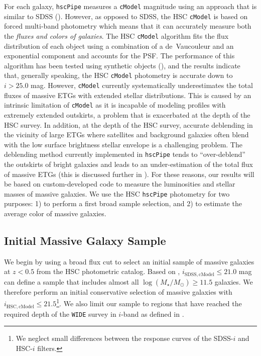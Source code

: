 \documentclass[a4paper,fleqn,usenatbib]{mnras}
\def\cmodel{\texttt{cModel}}
\def\logms{{$\log (M_{\star}/M_{\odot})$}}
\begin{document}
    For each galaxy, \texttt{hscPipe} measures a \cmodel{} magnitude using an approach 
    that is similar to SDSS (\citealt{HSC-PIPE}). 
    However, as opposed to SDSS, the HSC \cmodel{} is based on forced multi-band 
    photometry which means that it can accurately measure both the 
    \textit{fluxes and colors of galaxies}. 
    The HSC \cmodel{} algorithm fits the flux distribution of each object using a 
    combination of a de~Vaucouleur and an exponential component and accounts for the PSF. 
    The performance of this algorithm has been tested using synthetic objects 
    (\citealt{SynPipe}), and the results indicate that, generally speaking, 
    the HSC \cmodel{} photometry is accurate down to $i >25.0$ mag.  
    However, \cmodel{} currently systematically underestimates the total fluxes of 
    massive ETGs with extended stellar distributions. 
    This is caused by an intrinsic limitation of \cmodel{} as it is incapable of
    modeling profiles with extremely extended outskirts, a problem that is exacerbated 
    at the depth of the HSC survey. 
    In addition, at the depth of the HSC survey, accurate deblending in the vicinity of
    large ETGs where satellites and background galaxies often blend with the low surface 
    brightness stellar envelope is a challenging problem. 
    The deblending method currently implemented in \texttt{hscPipe} tends to 
    ``over-deblend'' the outskirts of bright galaxies and leads to an 
    under-estimation of the total flux of massive ETGs (this is discussed further in 
    \citealt{HSC-PIPE}).   
    For these reasons, our results will be based on custom-developed code to measure 
    the luminosities and stellar masses of massive galaxies. 
    We use the HSC \texttt{hscPipe} photometry for two purposes: 
    1) to perform a first broad sample selection, and 2) to estimate the average 
    color of massive galaxies.

\subsection{Initial Massive Galaxy Sample}
    \label{ssec:initial}
    
    We begin by using a broad flux cut to select an initial sample of massive 
    galaxies at $z < 0.5$ from the HSC photometric catalog. 
    Based on \citet{Leauthaud2016}, $i_{\mathrm{SDSS, cModel}} \leq 21.0$ mag can 
    define a sample that includes almost all \logms{}$\geq 11.5$ galaxies.    
    We therefore perform an initial conservative selection of massive galaxies
    with $i_{\mathrm{HSC, cModel}} \leq 21.5$\footnote{We neglect small differences
    between the response curves of the SDSS-$i$ and HSC-$i$ filters.}. 
    We also limit our sample to regions that have reached the required depth of 
    the \texttt{WIDE} survey in $i$-band as defined in \citet{HSC-DR1}.
    
\end{document}
